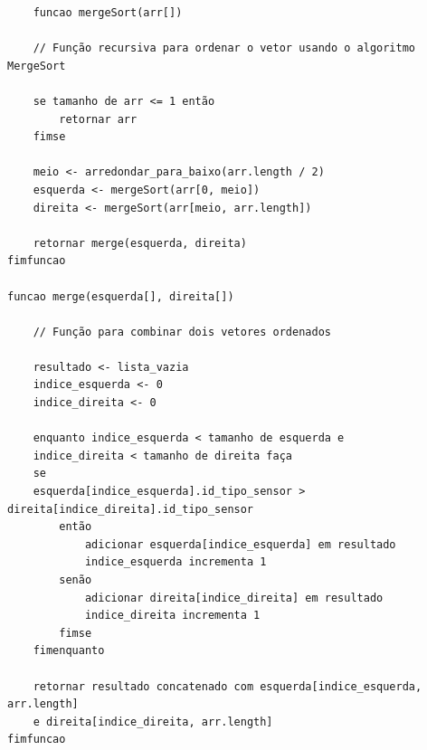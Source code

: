 \begin{verbatim}
    funcao mergeSort(arr[])

    // Função recursiva para ordenar o vetor usando o algoritmo MergeSort

    se tamanho de arr <= 1 então
        retornar arr
    fimse

    meio <- arredondar_para_baixo(arr.length / 2)
    esquerda <- mergeSort(arr[0, meio])
    direita <- mergeSort(arr[meio, arr.length])

    retornar merge(esquerda, direita)
fimfuncao

funcao merge(esquerda[], direita[])

    // Função para combinar dois vetores ordenados

    resultado <- lista_vazia
    indice_esquerda <- 0
    indice_direita <- 0

    enquanto indice_esquerda < tamanho de esquerda e 
    indice_direita < tamanho de direita faça
    se 
    esquerda[indice_esquerda].id_tipo_sensor > direita[indice_direita].id_tipo_sensor 
        então
            adicionar esquerda[indice_esquerda] em resultado
            indice_esquerda incrementa 1
        senão
            adicionar direita[indice_direita] em resultado
            indice_direita incrementa 1
        fimse
    fimenquanto

    retornar resultado concatenado com esquerda[indice_esquerda, arr.length] 
    e direita[indice_direita, arr.length]
fimfuncao
    \end{verbatim}
